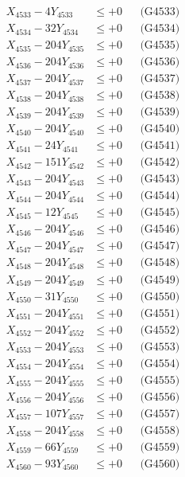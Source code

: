 \documentclass[a4paper,10pt]{article}
\begin{document}
{\begin{align}
X_{4533} - 4Y_{4533} &\leq +0 && \text{(G4533)} \\
X_{4534} - 32Y_{4534} &\leq +0 && \text{(G4534)} \\
X_{4535} - 204Y_{4535} &\leq +0 && \text{(G4535)} \\
X_{4536} - 204Y_{4536} &\leq +0 && \text{(G4536)} \\
X_{4537} - 204Y_{4537} &\leq +0 && \text{(G4537)} \\
X_{4538} - 204Y_{4538} &\leq +0 && \text{(G4538)} \\
X_{4539} - 204Y_{4539} &\leq +0 && \text{(G4539)} \\
X_{4540} - 204Y_{4540} &\leq +0 && \text{(G4540)} \\
\allowbreak
X_{4541} - 24Y_{4541} &\leq +0 && \text{(G4541)} \\
X_{4542} - 151Y_{4542} &\leq +0 && \text{(G4542)} \\
X_{4543} - 204Y_{4543} &\leq +0 && \text{(G4543)} \\
X_{4544} - 204Y_{4544} &\leq +0 && \text{(G4544)} \\
X_{4545} - 12Y_{4545} &\leq +0 && \text{(G4545)} \\
X_{4546} - 204Y_{4546} &\leq +0 && \text{(G4546)} \\
X_{4547} - 204Y_{4547} &\leq +0 && \text{(G4547)} \\
X_{4548} - 204Y_{4548} &\leq +0 && \text{(G4548)} \\
X_{4549} - 204Y_{4549} &\leq +0 && \text{(G4549)} \\
X_{4550} - 31Y_{4550} &\leq +0 && \text{(G4550)} \\
\allowbreak
X_{4551} - 204Y_{4551} &\leq +0 && \text{(G4551)} \\
X_{4552} - 204Y_{4552} &\leq +0 && \text{(G4552)} \\
X_{4553} - 204Y_{4553} &\leq +0 && \text{(G4553)} \\
X_{4554} - 204Y_{4554} &\leq +0 && \text{(G4554)} \\
X_{4555} - 204Y_{4555} &\leq +0 && \text{(G4555)} \\
X_{4556} - 204Y_{4556} &\leq +0 && \text{(G4556)} \\
X_{4557} - 107Y_{4557} &\leq +0 && \text{(G4557)} \\
X_{4558} - 204Y_{4558} &\leq +0 && \text{(G4558)} \\
X_{4559} - 66Y_{4559} &\leq +0 && \text{(G4559)} \\
X_{4560} - 93Y_{4560} &\leq +0 && \text{(G4560)} \\

\end{align}}
\end{document}

